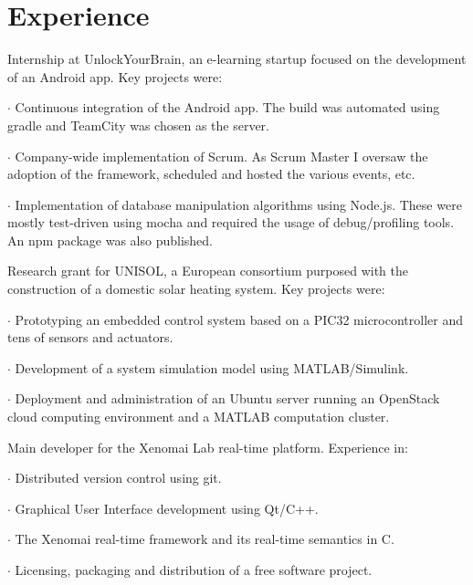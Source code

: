 \section*{Experience}

{
Internship at UnlockYourBrain, an e-learning startup focused on the development
of an Android app. Key projects were:

 $\cdot$  Continuous integration of the Android app. The build was automated
using gradle and TeamCity was chosen as the server.

 $\cdot$  Company-wide implementation of Scrum. As Scrum Master I oversaw the
adoption of the framework, scheduled and hosted  the various events, etc.

 $\cdot$  Implementation of database manipulation algorithms using Node.js.
These were mostly test-driven using mocha and required the usage of
debug/profiling tools. An npm package was also published.
}

\vspace{\baselineskip}
{
Research grant for UNISOL, a European consortium purposed with the construction
of a domestic solar heating system. Key projects were:

 $\cdot$  Prototyping an embedded control system based on a PIC32 microcontroller and
tens of sensors and actuators.

 $\cdot$  Development of a system simulation model using MATLAB/Simulink.

 $\cdot$  Deployment and administration of an Ubuntu server running an
OpenStack cloud computing environment and a MATLAB computation cluster.
}

\vspace{\baselineskip}
{
Main developer for the Xenomai Lab real-time platform. Experience in:

 $\cdot$ Distributed version control using git.

 $\cdot$ Graphical User Interface development using Qt/C++.

 $\cdot$ The Xenomai real-time framework and its real-time semantics in C.

 $\cdot$ Licensing, packaging and distribution of a free software project.

}

